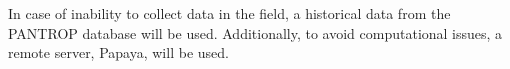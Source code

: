 

In case of inability to collect data in the field, a historical data from the PANTROP database will be used. Additionally, to avoid computational issues, a remote server, Papaya, will be used.